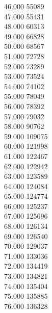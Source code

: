 { 46.000	55089 \\
 47.000	55431 \\
 48.000	60313 \\
 49.000	66828 \\
 50.000	68567 \\
 51.000	72728 \\
 52.000	73289 \\
 53.000	73524 \\
 54.000	74102 \\
 55.000	78049 \\
 56.000	78392 \\
 57.000	79032 \\
 58.000	90762 \\
 59.000	109075 \\
 60.000	121998 \\
 61.000	122467 \\
 62.000	122942 \\
 63.000	123589 \\
 64.000	124084 \\
 65.000	124774 \\
 66.000	125237 \\
 67.000	125696 \\
 68.000	126134 \\
 69.000	126540 \\
 70.000	129037 \\
 71.000	133036 \\
 72.000	134419 \\
 73.000	134821 \\
 74.000	135404 \\
 75.000	135885 \\
 76.000	136328 \\
}
